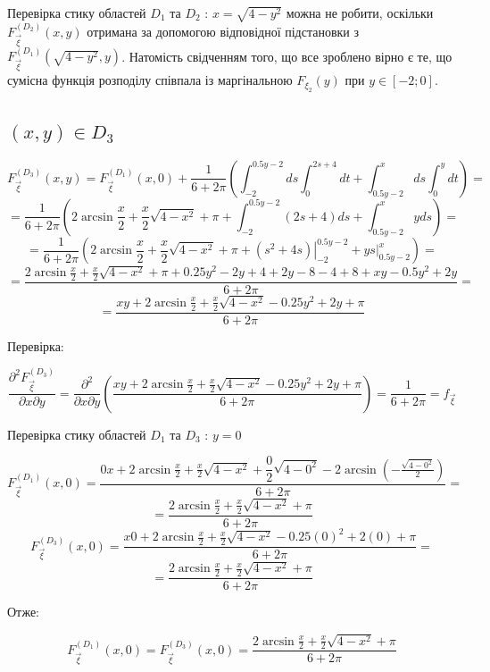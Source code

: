 \documentclass[14pt, a4paper, ukrainian]{extreport}
\begin{document}
	Перевірка стику областей $D_1$ та $D_2$ : $ x = \sqrt{4-y^2}$ можна не робити, оскільки $F_{\vec \xi}^{\left(D_2\right)}(x, y)$ отримана за допомогою відповідної підстановки з \\
	$F_{\vec \xi}^{\left(D_1\right)}(\sqrt{4-y^2}, y)$. Натомість свідченням того, що все зроблено вірно є те, що сумісна функція розподілу співпала із маргінальною $ F_{\xi_2} (y) $ при $y \in [-2; 0]$.
	
	\subsection{$(x, y) \in D_3 $}
	
	$$ F_{\vec \xi}^{\left(D_3\right)}(x, y) = F_{\vec \xi}^{\left(D_1\right)}(x, 0) + \frac{1}{6+2\pi}\left(\int_{-2}^{0.5y-2}ds\int_{0}^{2s+4}dt +  \int_{0.5y-2}^{x}ds\int_{0}^{y}dt\right)= 
	$$
	$$ = \frac{1}{6+2\pi}\left(2\arcsin\frac{x}{2} + \frac{x}{2}\sqrt{4-x^2} + \pi + \int_{-2}^{0.5y-2}(2s+4)ds + \int_{0.5y-2}^{x}yds\right) = 
	$$
	$$ = \frac{1}{6+2\pi}\left(2\arcsin\frac{x}{2} + \frac{x}{2}\sqrt{4-x^2} + \pi + \left.\left(s^2 + 4s\right)\right|_{-2}^{0.5y-2} +  \left.ys\right|_{0.5y-2}^x\right) = 
	$$
	$$ = \frac{2\arcsin\frac{x}{2} + \frac{x}{2}\sqrt{4-x^2} + \pi + 0.25y^2 - 2 y + 4 + 2y - 8 - 4 + 8 + xy - 0.5y^2 + 2y}{6+2\pi} = 
	$$
	$$ = \frac{xy + 2\arcsin\frac{x}{2} + \frac{x}{2}\sqrt{4-x^2} - 0.25y^2 + 2y + \pi}{6+2\pi}
	$$
	
	Перевірка:
	
	$$\frac{\partial^2F_{\vec\xi}^{\left(D_3\right)}}{\partial x \partial y} = \frac{\partial^2}{\partial x \partial y}\left(\frac{xy + 2\arcsin\frac{x}{2} + \frac{x}{2}\sqrt{4-x^2} - 0.25y^2 + 2y + \pi}{6+2\pi}\right) = \frac{1}{6+2\pi} = f_{\vec\xi}
	$$
	
	Перевірка стику областей $D_1$ та $D_3$ : $ y =0$
	
	$$ F_{\vec\xi}^{\left({D_1}\right)}(x, 0) = \dfrac{0x + 2\arcsin\frac{x}{2} + \frac{x}{2}\sqrt{4-x^2} + \dfrac{0}{2}\sqrt{4-0^2} - 2\arcsin{\left(-\frac{\sqrt{4-0^2}}{2}\right)}}{6+2\pi} = 
	$$
	$$ = \dfrac{2\arcsin\frac{x}{2} + \frac{x}{2}\sqrt{4-x^2} + \pi}{6+2\pi}
	$$
	$$ F_{\vec\xi}^{\left({D_3}\right)}(x, 0) = \frac{x0 + 2\arcsin\frac{x}{2} + \frac{x}{2}\sqrt{4-x^2} - 0.25(0)^2 + 2(0) + \pi}{6+2\pi} = 
	$$
	$$ = \dfrac{2\arcsin\frac{x}{2} + \frac{x}{2}\sqrt{4-x^2} + \pi}{6+2\pi}
	$$
	
	Отже:
	
	$$  F_{\vec\xi}^{\left({D_1}\right)}(x, 0) =  F_{\vec\xi}^{\left({D_3}\right)}(x, 0) = \dfrac{2\arcsin\frac{x}{2} + \frac{x}{2}\sqrt{4-x^2} + \pi}{6+2\pi}
	$$
		
\end{document}

